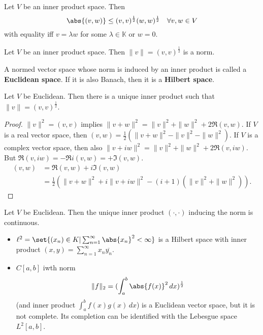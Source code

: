 \documentclass{article}
\newcommand{\K}{\mathbb{K}}
\begin{document}
\begin{prop}
    Let $V$ be an inner product space. Then
    \begin{equation*}
        \abs{(v, w)} \leq (v,v)^\frac{1}{2} (w, w)^\frac{1}{2} \quad \forall v, w \in V
    \end{equation*}
    with equality iff $v = \lambda w$ for some $\lambda \in \K$ or $w = 0$.
\end{prop}

\begin{cor}
    Let $V$ be an inner product space. Then $\|v\| = (v,v)^\frac{1}{2}$ is a norm.
\end{cor}

\begin{defi}
    A normed vector space whose norm is induced by an inner product is called a \textbf{Euclidean space}.
    If it is also Banach, then it is a \textbf{Hilbert space}.
\end{defi}

\begin{fact}
    Let $V$ be Euclidean. Then there is a unique inner product such that $\|v\| = (v,v)^\frac{1}{2}$.
\end{fact}

\begin{proof}
    $\|v\|^2 = (v,v)$ implies $\|v+w\|^2 = \|v\|^2 + \|w\|^2 + 2 \Re(v, w)$.
    If $V$ is a real vector space, then $(v, w) = \frac{1}{2}(\|v+w\|^2 - \|v\|^2 - \|w\|^2)$.
    If $V$ is a complex vector space, then also $\|v + iw\|^2 = \|v\|^2 + \|w\|^2 + 2 \Re(v, iw)$. But $\Re(v, iw) = -\Re i (v, w) = + \Im(v, w)$.
    \begin{align*}
        (v, w) &= \Re (v, w) + i \Im (v, w)  \\
               &= \frac{1}{2} (\|v+w\|^2 + i \|v + i w\|^2 - (i+1) (\|v\|^2 + \|w\|^2)).
    \end{align*}
\end{proof}

\begin{fact}
    Let $V$ be Euclidean. Then the unique inner product $(\cdot, \cdot)$ inducing the norm is continuous.
\end{fact}


\begin{eg}
    \leavevmode
    \begin{itemize}
        \item $\ell^2 = \set{(x_n) \in K | \sum_{n=1}^\infty \abs{x_n}^2 < \infty}$ is a Hilbert space with inner product $(x, y) = \sum_{n=1}^\infty x_n \overline{y_n}$.
        \item $C[a, b]$ iwth norm
            \begin{equation*}
                \|f\|_2 = (\int_a^b \abs{f(x)}^2\, dx )^\frac{1}{2}
            \end{equation*}
            (and inner product $\int_a^b f(x) g(x) \, dx$) is a Euclidean vector space, but it is not complete.
            Its completion can be identified with the Lebesgue space $L^2[a, b]$.
    \end{itemize}
\end{eg}
\end{document}
